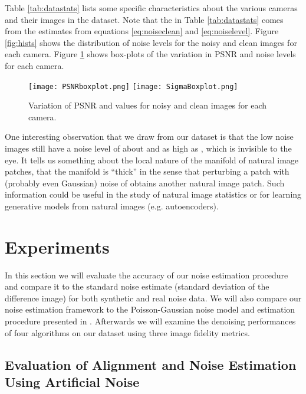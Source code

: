 \documentclass[review]{elsarticle}
\begin{document}
Table \ref{tab:datastats} lists some specific characteristics about the various cameras and their images in the dataset. Note that the  in Table \ref{tab:datastats} comes from the estimates from equations \eqref{eq:noiseclean} and \eqref{eq:noiselevel}. Figure \ref{fig:hists} shows the distribution of noise levels for the noisy and clean images for each camera. Figure \ref{fig:boxplots} shows box-plots of the variation in PSNR and noise levels for each camera.
\begin{figure}[t]
\vspace{-3mm}
\centering
\texttt{[image: PSNRboxplot.png]}
\texttt{[image: SigmaBoxplot.png]}
\vskip -3mm
\caption{Variation of PSNR and  values for noisy and clean images for each camera.}
\label{fig:boxplots}
\vspace{-5mm}
\end{figure}


One interesting observation that we draw from our dataset is that the low noise images still have a noise level  of about  and as high as , which is invisible to the eye. It tells us something about the local nature of the manifold of natural image patches, that the manifold is ``thick'' in the sense that perturbing a patch with (probably even Gaussian) noise of  obtains another natural image patch. Such information could be useful in the study of natural image statistics or for learning generative models from natural images (e.g. autoencoders).

\section{Experiments}

In this section we will evaluate the accuracy of our noise estimation procedure and compare it to the standard noise estimate (standard deviation of the difference image) for both synthetic and real noise data. We will also compare our noise estimation framework to the Poisson-Gaussian noise model and estimation procedure presented in \cite{Foi-Poisson}. Afterwards we will examine the denoising performances of four algorithms on our dataset using three image fidelity metrics.
 
\subsection{Evaluation of Alignment and Noise Estimation Using Artificial Noise} \label{subsec:noiseeval}
\end{document}
